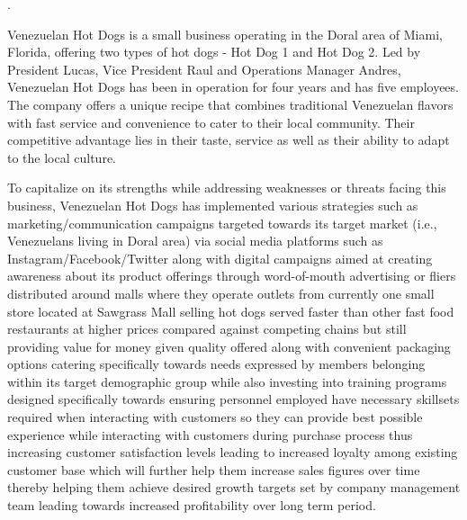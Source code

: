 .

Venezuelan Hot Dogs is a small business operating in the Doral area of Miami, Florida, offering two types of hot dogs - Hot Dog 1 and Hot Dog 2. Led by President Lucas, Vice President Raul and Operations Manager Andres, Venezuelan Hot Dogs has been in operation for four years and has five employees. The company offers a unique recipe that combines traditional Venezuelan flavors with fast service and convenience to cater to their local community. Their competitive advantage lies in their taste, service as well as their ability to adapt to the local culture. 

To capitalize on its strengths while addressing weaknesses or threats facing this business, Venezuelan Hot Dogs has implemented various strategies such as marketing/communication campaigns targeted towards its target market (i.e., Venezuelans living in Doral area) via social media platforms such as Instagram/Facebook/Twitter along with digital campaigns aimed at creating awareness about its product offerings through word-of-mouth advertising or fliers distributed around malls where they operate outlets from currently one small store located at Sawgrass Mall selling hot dogs served faster than other fast food restaurants at higher prices compared against competing chains but still providing value for money given quality offered along with convenient packaging options catering specifically towards needs expressed by members belonging within its target demographic group while also investing into training programs designed specifically towards ensuring personnel employed have necessary skillsets required when interacting with customers so they can provide best possible experience while interacting with customers during purchase process thus increasing customer satisfaction levels leading to increased loyalty among existing customer base which will further help them increase sales figures over time thereby helping them achieve desired growth targets set by company management team leading towards increased profitability over long term period.